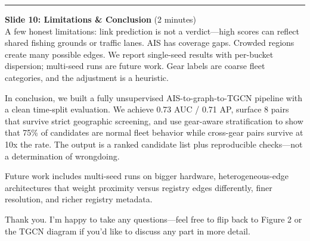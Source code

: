 \documentclass[
]{article}
\begin{document}
\begin{center}\rule{0.5\linewidth}{0.5pt}\end{center}

\textbf{Slide 10: Limitations \& Conclusion} (2 minutes)\\
A few honest limitations: link prediction is not a verdict---high scores
can reflect shared fishing grounds or traffic lanes. AIS has coverage
gaps. Crowded regions create many possible edges. We report single-seed
results with per-bucket dispersion; multi-seed runs are future work.
Gear labels are coarse fleet categories, and the adjustment is a
heuristic.

In conclusion, we built a fully unsupervised AIS-to-graph-to-TGCN
pipeline with a clean time-split evaluation. We achieve 0.73 AUC / 0.71
AP, surface 8 pairs that survive strict geographic screening, and use
gear-aware stratification to show that 75\% of candidates are normal
fleet behavior while cross-gear pairs survive at 10x the rate. The
output is a ranked candidate list plus reproducible checks---not a
determination of wrongdoing.

Future work includes multi-seed runs on bigger hardware,
heterogeneous-edge architectures that weight proximity versus registry
edges differently, finer resolution, and richer registry metadata.

Thank you. I'm happy to take any questions---feel free to flip back to
Figure 2 or the TGCN diagram if you'd like to discuss any part in more
detail.
\end{document}
